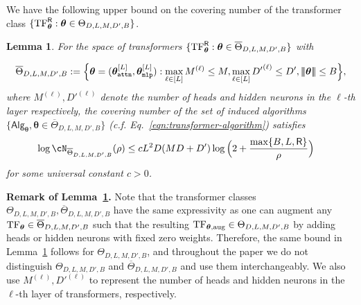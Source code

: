\documentclass[10pt]{article}
\newtheorem{lemma}[theorem]{Lemma}
\renewcommand{\bar}{\overline}
\newcommand{\<}{\left\langle}
\renewcommand{\>}{\right\rangle}
\newcommand{\lth}{{(\ell)}}
\newcommand{\TF}{{\rm TF}}
\newcommand{\nrmp}[1]{{\left|\!\left|\!\left|{#1}\right|\!\right|\!\right|}}
\newcommand{\mlp}{{\tt mlp}}
\newcommand{\attn}{{\tt attn}}
\newcommand{\sAlg}{{\mathsf{Alg}}}
\newcommand{\tfpar}{{\btheta}}
\newcommand{\tfparspace}{{\Theta}}
\newcommand{\layer}{{L}}
\newcommand{\hidden}{{D'}}
\newcommand{\head}{{M}}
\newcommand{\normb}{{B}}
\newcommand{\clipval}{{\mathsf{R}}}
\newcommand{\embd}{{D}}
\def\btheta{{\boldsymbol \theta}}
\begin{document}
We have the following upper bound on the covering number of the transformer class $\{\TF^\clipval_{\tfpar}:\tfpar\in\tfparspace_{D, \layer,\head,\hidden,\normb}\}$.  
\begin{lemma}\label{lm:cover_num_bound}
For the space of transformers $\{\TF^\clipval_{\tfpar}:\tfpar\in\bar{\tfparspace}_{D, \layer,\head,\hidden,\normb}\}$ with 

\begin{align*}
\bar{\tfparspace}_{D, \layer,\head,\hidden,\normb}:= \Big\{\tfpar=(\tfpar^{[\layer]}_\attn,\tfpar^{[\layer]}_\mlp):\max_{\ell\in[\layer]}\head^\lth\leq \head, \max_{\ell\in[\layer]}\hidden^\lth\leq \hidden, \nrmp{\tfpar}\leq\normb \Big\}, 
\end{align*}where $\head^\lth,\hidden^\lth$ denote the number  of heads and hidden neurons in the $\ell$-th layer respectively, the covering number of the set of induced algorithms $\{\sAlg_\tfpar,\tfpar\in\bar{\tfparspace}_{D, \layer,\head,\hidden,\normb}\}$ (c.f. Eq.~\ref{eqn:transformer-algorithm}) satisfies
\begin{align*}
    \log \cN_{\bar{\tfparspace}_{D, \layer,\head,\hidden,\normb}}(\rho)
    &\leq c\layer^2\embd(\head\embd+\hidden)\log\Big(2+\frac{\max\{\normb,\layer,\clipval\}}{\rho}\Big)
\end{align*} for some universal constant $c>0$. 







\end{lemma}
\textbf{Remark of Lemma~\ref{lm:cover_num_bound}.} Note that the transformer classes ${\tfparspace}_{D, \layer,\head,\hidden,\normb},\bar{\tfparspace}_{D, \layer,\head,\hidden,\normb}$ have the same expressivity as one can augment any $\TF_\tfpar\in \bar{\tfparspace}_{D, \layer,\head,\hidden,\normb}$ such that the resulting $\TF_{\tfpar,\mathrm{aug}}\in{\tfparspace}_{D, \layer,\head,\hidden,\normb}$ by adding heads or hidden neurons with fixed zero weights. Therefore, the same bound in Lemma~\ref{lm:cover_num_bound} follows for ${\tfparspace}_{D, \layer,\head,\hidden,\normb}$, and  throughout the paper we do not distinguish ${\tfparspace}_{D, \layer,\head,\hidden,\normb}$ and $\bar{\tfparspace}_{D, \layer,\head,\hidden,\normb}$ and use them interchangeably. We also use $\head^\lth,\hidden^\lth$ to  represent the number  of heads and hidden neurons in the $\ell$-th layer of transformers, respectively. 
\end{document}
